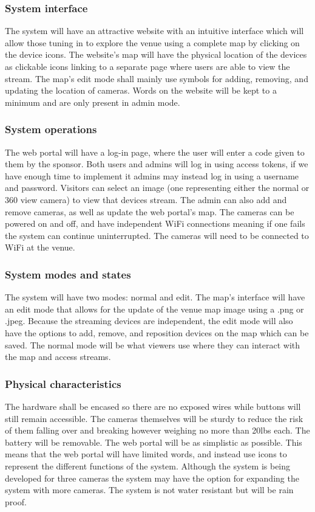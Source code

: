 \documentclass[onecolumn, draftclsnofoot,10pt, compsoc]{IEEEtran}
\begin{document}
    \subsubsection{System interface}
    The system will have an attractive website with an intuitive interface which will allow those tuning in to explore the venue using a complete map by clicking on the device icons. 
    The website's map will have the physical location of the devices as clickable icons linking to a separate page where users are able to view the stream.
    The map's edit mode shall mainly use symbols for adding, removing, and updating the location of cameras. Words on the website will be kept to a minimum and are only present in admin mode.

    \subsubsection{System operations}
    The web portal will have a log-in page, where the user will enter a code given to them by the sponsor.
    Both users and admins will log in using access tokens, if we have enough time to implement it admins may instead log in using a username and password.
    Visitors can select an image (one representing either the normal or 360 view camera) to view that devices stream. 
    The admin can also add and remove cameras, as well as update the web portal's map.
    The cameras can be powered on and off, and have independent WiFi connections meaning if one fails the system can continue uninterrupted. The cameras will need to be connected to WiFi at the venue.
    
    \subsubsection{System modes and states}
    The system will have two modes: normal and edit. The map’s interface will have an edit mode that allows for the update of the venue map image using a .png or .jpeg. 
    Because the streaming devices are independent, the edit mode will also have the options to add, remove, and reposition devices on the map which can be saved. The normal mode will be what viewers use where they can interact with the map and access streams.
    
    \subsubsection{Physical characteristics}
    The hardware shall be encased so there are no exposed wires while buttons will still remain accessible.
    The cameras themselves will be sturdy to reduce the risk of them falling over and breaking however weighing no more than 20lbs each. 
    The battery will be removable.
    The web portal will be as simplistic as possible.
    This means that the web portal will have limited words, and instead use icons to represent the different functions of the system. Although the system is being developed for three cameras the system may have the option for expanding the system with more cameras.
    The system is not water resistant but will be rain proof.
    
\end{document}
